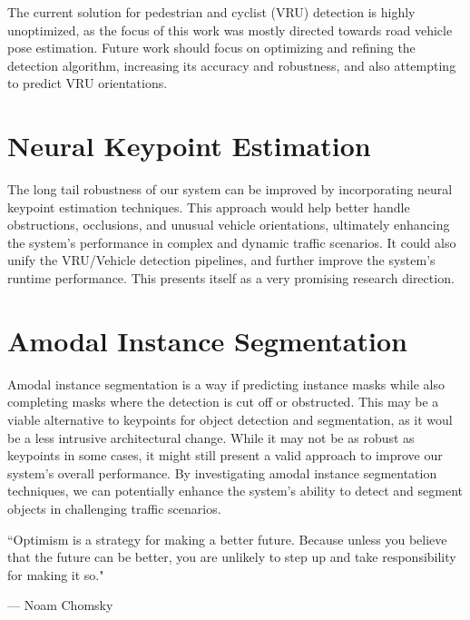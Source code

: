 The current solution for pedestrian and cyclist (VRU) detection is highly unoptimized, as the focus of this work was mostly directed towards road vehicle pose estimation.
Future work should focus on optimizing and refining the detection algorithm, increasing its accuracy and robustness, and also attempting to predict VRU orientations.

\section{Neural Keypoint Estimation}
\label{sec:neuralkeypoints}

The long tail robustness of our system can be improved by incorporating neural keypoint estimation techniques.
This approach would help better handle obstructions, occlusions, and unusual vehicle orientations, ultimately enhancing the system's performance in complex and dynamic traffic scenarios.
It could also unify the VRU/Vehicle detection pipelines, and further improve the system's runtime performance.
This presents itself as a very promising research direction.

\section{Amodal Instance Segmentation}
\label{sec:amodal}

Amodal instance segmentation is a way if predicting instance masks while also completing masks where the detection is cut off or obstructed.
This may be a viable alternative to keypoints for object detection and segmentation, as it woul be a less intrusive architectural change.
While it may not be as robust as keypoints in some cases, it might still present a valid approach to improve our system's overall performance.
By investigating amodal instance segmentation techniques, we can potentially enhance the system's ability to detect and segment objects in challenging traffic scenarios.

\par\vspace*{\fill}
\epigraph{``Optimism is a strategy for making a better future. Because unless you believe that the future can be better, you are unlikely to step up and take responsibility for making it so."}{--- \textup{Noam Chomsky}}
